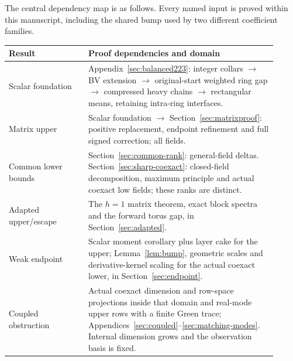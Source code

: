 \documentclass[11pt]{article}
\begin{document}
The central dependency map is as follows. Every named input is proved
within this manuscript, including the shared bump used by two different
coefficient families.
\begin{center}\small
\begin{tabular}{p{0.27\linewidth}p{0.64\linewidth}}
\toprule
Result & Proof dependencies and domain\\
\midrule
Scalar foundation & Appendix~\ref{sec:balanced223}: integer collars $\to$
BV extension $\to$ original-start weighted ring gap $\to$ compressed
heavy chains $\to$ rectangular means, retaining intra-ring interfaces.\\
Matrix upper & Scalar foundation $\to$ Section~\ref{sec:matrixproof}:
positive replacement, endpoint refinement and full signed correction;
all fields.\\
Common lower bounds & Section~\ref{sec:common-rank}: general-field deltas.
Section~\ref{sec:sharp-coexact}: closed-field decomposition, maximum
principle and actual coexact low fields; these ranks are distinct.\\
Adapted upper/escape & The $h=1$ matrix theorem, exact block spectra and
the forward torus gap, in Section~\ref{sec:adapted}.\\
Weak endpoint & Scalar moment corollary plus layer cake for the upper;
Lemma~\ref{lem:bump}, geometric scales and derivative-kernel scaling for
the actual coexact lower, in Section~\ref{sec:endpoint}.\\
Coupled obstruction & Actual coexact dimension and row-space projections
inside that domain and real-mode upper rows with a finite Green trace;
Appendices~\ref{sec:coupled}--\ref{sec:matching-modes}. Internal dimension grows
and the observation basis is fixed.\\
\bottomrule
\end{tabular}
\end{center}
\end{document}
